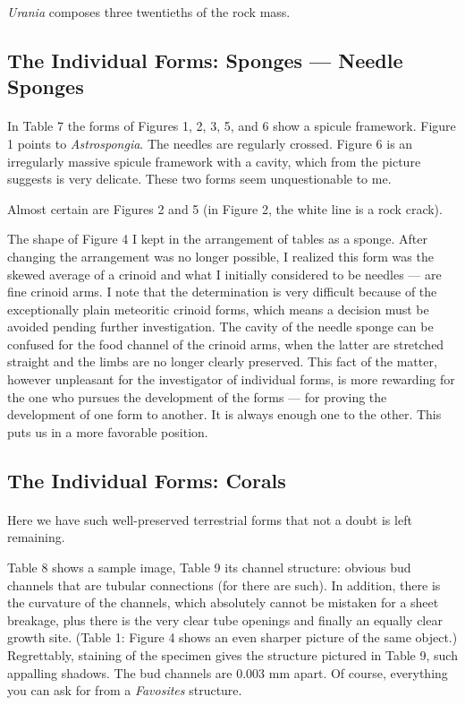 \documentclass[a4paper, 12pt, oneside]{article}
\begin{document}
\emph{Urania} composes three twentieths of the rock mass.
\clearpage
\subsection{The Individual Forms: Sponges — Needle Sponges}
\paragraph{}
In Table 7 the forms of Figures 1, 2, 3, 5, and 6 show a spicule framework. Figure 1 points to \emph{Astrospongia}. The needles are regularly crossed. Figure 6 is an irregularly massive spicule framework with a cavity, which from the picture suggests is very delicate. These two forms seem unquestionable to me.

Almost certain are Figures 2 and 5 (in Figure 2, the white line is a rock crack).

The shape of Figure 4 I kept in the arrangement of tables as a sponge. After changing the arrangement was no longer possible, I realized this form was the skewed average of a crinoid and what I initially considered to be needles — are fine crinoid arms. I note that the determination is very difficult because of the exceptionally plain meteoritic crinoid forms, which means a decision must be avoided pending further investigation. The cavity of the needle sponge can be confused for the food channel of the crinoid arms, when the latter are stretched straight and the limbs are no longer clearly preserved. This fact of the matter, however unpleasant for the investigator of individual forms, is more rewarding for the one who pursues the development of the forms — for proving the development of one form to another. It is always enough one to the other. This puts us in a more favorable position.
\clearpage
\subsection{The Individual Forms: Corals}
\paragraph{}
Here we have such well-preserved terrestrial forms that not a doubt is left remaining.

Table 8 shows a sample image, Table 9 its channel structure: obvious bud channels that are tubular connections (for there are such). In addition, there is the curvature of the channels, which absolutely cannot be mistaken for a sheet breakage, plus there is the very clear tube openings and finally an equally clear growth site. (Table 1: Figure 4 shows an even sharper picture of the same object.) Regrettably, staining of the specimen gives the structure pictured in Table 9, such appalling shadows. The bud channels are 0.003 mm apart. Of course, everything you can ask for from a \emph{Favosites} structure.
\end{document}
